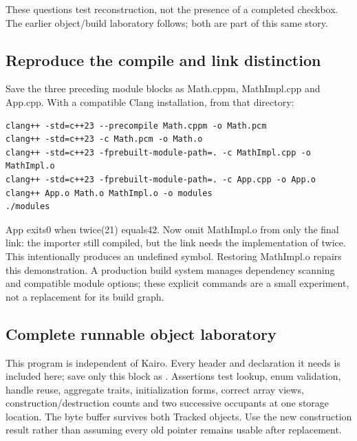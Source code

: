 These questions test reconstruction, not the presence of a completed checkbox. The earlier object/build laboratory follows; both are part of this same story.

\subsection{Reproduce the compile and link distinction}\label{01-foundations-i-ch004-reproduce-the-compile-and-link-distinction}

\hypertarget{01-foundations-i-ch004-reproduce-the-compile-and-link-distinction}{}

Save the three preceding module blocks as Math.cppm, MathImpl.cpp and App.cpp. With a compatible Clang installation, from that directory:

\begin{verbatim}
clang++ -std=c++23 --precompile Math.cppm -o Math.pcm
clang++ -std=c++23 -c Math.pcm -o Math.o
clang++ -std=c++23 -fprebuilt-module-path=. -c MathImpl.cpp -o MathImpl.o
clang++ -std=c++23 -fprebuilt-module-path=. -c App.cpp -o App.o
clang++ App.o Math.o MathImpl.o -o modules
./modules
\end{verbatim}

App exits0 when twice(21) equals42. Now omit MathImpl.o from only the final link: the importer still compiled, but the link needs the implementation of twice. This intentionally produces an undefined symbol. Restoring MathImpl.o repairs this demonstration. A production build system manages dependency scanning and compatible module options; these explicit commands are a small experiment, not a replacement for its build graph.

\subsection{Complete runnable object laboratory}\label{01-foundations-i-ch004-complete-runnable-object-laboratory}

\hypertarget{01-foundations-i-ch004-complete-runnable-object-laboratory}{}

This program is independent of Kairo. Every header and declaration it needs is included here; save only this block as . Assertions test lookup, enum validation, handle reuse, aggregate traits, initialization forms, correct array views, construction/destruction counts and two successive occupants at one storage location. The byte buffer survives both Tracked objects. Use the new construction result rather than assuming every old pointer remains usable after replacement.

